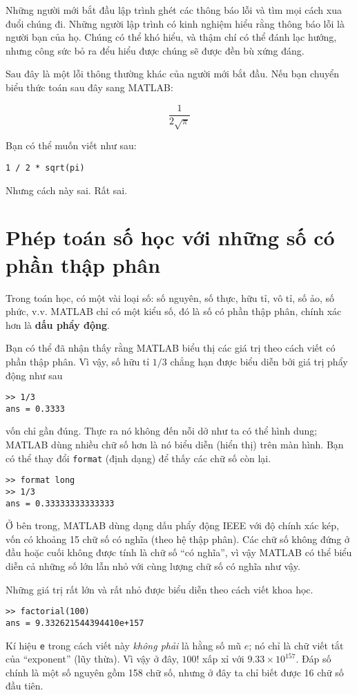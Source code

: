 \documentclass[12pt]{book}
\begin{document}
Những người mới bắt đầu lập trình ghét các thông báo lỗi và tìm mọi cách
xua đuổi chúng đi. Những người lập trình có kinh nghiệm hiểu rằng thông
báo lỗi là người bạn của họ. Chúng có thể khó hiểu, và thậm chí có thể
đánh lạc hướng, nhưng công sức bỏ ra đểu hiểu được chúng sẽ được
đền bù xứng đáng.

Sau đây là một lỗi thông thường khác của người mới bắt đầu. Nếu bạn 
chuyển biểu thức toán sau đây sang MATLAB:

\[ \frac{1}{2 \sqrt \pi}\]

Bạn có thể muốn viết như sau:

\begin{verbatim}
1 / 2 * sqrt(pi)
\end{verbatim}
%
Nhưng cách này sai. Rất sai.


\section{Phép toán số học với những số có phần thập phân}

Trong toán học, có một vài loại số: số nguyên, số thực, hữu tỉ, vô tỉ,
số ảo, số phức, v.v. MATLAB chỉ có một kiểu số, đó là số có phần
thập phân, chính xác hơn là {\bf dấu phẩy động}.

Bạn có thể đã nhận thấy rằng MATLAB biểu thị các giá trị theo cách
viết có phần thập phân. Vì vậy, số hữu tỉ $1/3$ chẳng hạn được biểu
diễn bởi giá trị phẩy động như sau

\begin{verbatim}
>> 1/3
ans = 0.3333
\end{verbatim}
%
\noindent vốn chỉ gần đúng. Thực ra nó không đến nỗi dở như ta
có thể hình dung; MATLAB dùng nhiều chữ số hơn là nó biểu
diễn (hiển thị) trên màn hình. Bạn có thể thay đổi {\tt format} 
(định dạng) để thấy các chữ số còn lại.

\begin{verbatim}
>> format long
>> 1/3
ans = 0.33333333333333
\end{verbatim}
%
Ở bên trong, MATLAB dùng dạng dấu phẩy động IEEE với độ
chính xác kép, vốn có khoảng 15 chữ số có nghĩa (theo hệ thập
phân). Các chữ số không đứng ở đầu hoặc cuối không được
tính là chữ số ``có nghĩa'', vì vậy MATLAB có thể biểu diễn cả
những số lớn lẫn nhỏ với cùng lượng chữ số có nghĩa như vậy.

Những giá trị rất lớn và rất nhỏ được biểu diễn theo cách viết
khoa học.

\begin{verbatim}
>> factorial(100)
ans = 9.332621544394410e+157
\end{verbatim}
%
Kí hiệu {\tt e} trong cách viết này {\em không phải} là hằng số mũ 
$e$; nó chỉ là chữ viết tắt của ``exponent'' (lũy thừa). Vì vậy ở đây, 
$100!$ xấp xỉ với $9.33 \times 10^{157}$.  Đáp số chính là một 
số nguyên gồm 158 chữ số, nhưng ở đây ta chỉ biết được 16
chữ số đầu tiên.
\end{document}
